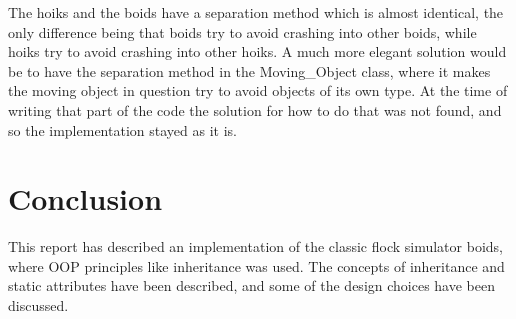 \documentclass{article}
\begin{document}
The hoiks and the boids have a separation method which is almost identical, the only difference being that boids try to avoid crashing into other boids, while hoiks try to avoid crashing into other hoiks. A much more elegant solution would be to have the separation method in the Moving\_Object class, where it makes the moving object in question try to avoid objects of its own type. At the time of writing that part of the code the solution for how to do that was not found, and so the implementation stayed as it is. 

\section{Conclusion}
This report has described an implementation of the classic flock simulator boids, where OOP principles like inheritance was used. The concepts of inheritance and static attributes have been described, and some of the design choices have been discussed. 



\end{document}
